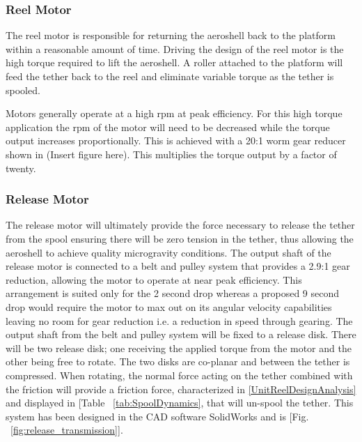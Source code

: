 \subsubsection{Reel Motor}

\indent\indent The reel motor is responsible for returning the aeroshell back to the platform within a reasonable amount of time. Driving the design of the reel motor is the high torque required to lift the aeroshell. A roller attached to the platform will feed the tether back to the reel and eliminate variable torque as the tether is spooled.

\indent\indent Motors generally operate at a high rpm at peak efficiency. For this high torque application the rpm of the motor will need to be decreased while the torque output increases proportionally. This is achieved with a 20:1 worm gear reducer shown in (Insert figure here). This multiplies the torque output by a factor of twenty.

\subsubsection{Release Motor} \label{ReleaseMotorDesignAnalysis}

\indent\indent The release motor will ultimately provide the force necessary to release the tether from the spool ensuring there will be zero tension in the tether, thus allowing the aeroshell to achieve quality microgravity conditions. The output shaft of the release motor is connected to a belt and pulley system that provides a 2.9:1 gear reduction, allowing the motor to operate at near peak efficiency. This arrangement is suited only for the 2 second drop whereas a proposed 9 second drop would require the motor to max out on its angular velocity capabilities leaving no room for gear reduction i.e. a reduction in speed through gearing. The output shaft from the belt and pulley system will be fixed to a release disk. There will be two release disk; one receiving the applied torque from the motor and the other being free to rotate. The two disks are co-planar and between the tether is compressed. When rotating, the normal force acting on the tether combined with the friction will provide a friction force, characterized in \ref{UnitReelDesignAnalysis} and displayed in [Table ~\ref{tab:SpoolDynamics}, that will un-spool the tether. This system has been designed in the CAD software SolidWorks and is [Fig. ~\ref{fig:release_transmission}]. 


